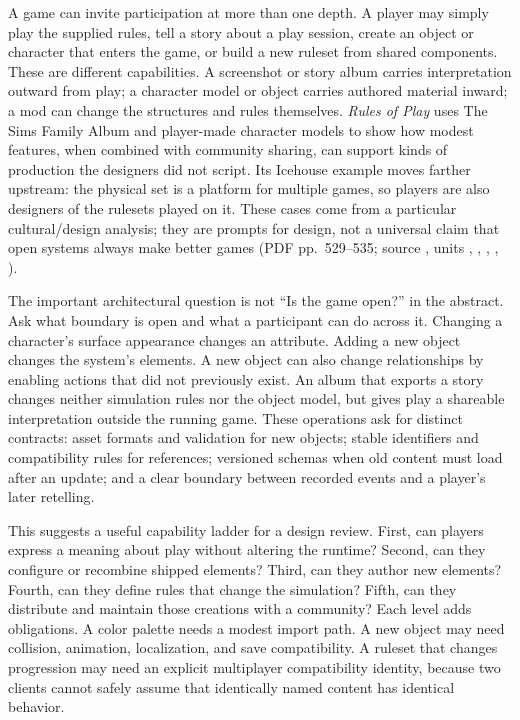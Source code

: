 \hypertarget{06-engine-ii-ch046-design-a-game-system-that-can-be-continued-by-players}{}

A game can invite participation at more than one depth. A player may simply play the supplied rules, tell a story about a play session, create an object or character that enters the game, or build a new ruleset from shared components. These are different capabilities. A screenshot or story album carries interpretation outward from play; a character model or object carries authored material inward; a mod can change the structures and rules themselves. \emph{Rules of Play} uses The Sims Family Album and player-made character models to show how modest features, when combined with community sharing, can support kinds of production the designers did not script. Its Icehouse example moves farther upstream: the physical set is a platform for multiple games, so players are also designers of the rulesets played on it. These cases come from a particular cultural/design analysis; they are prompts for design, not a universal claim that open systems always make better games (PDF pp.~529--535; source , units , , , , ).

The important architectural question is not ``Is the game open?'' in the abstract. Ask what boundary is open and what a participant can do across it. Changing a character's surface appearance changes an attribute. Adding a new object changes the system's elements. A new object can also change relationships by enabling actions that did not previously exist. An album that exports a story changes neither simulation rules nor the object model, but gives play a shareable interpretation outside the running game. These operations ask for distinct contracts: asset formats and validation for new objects; stable identifiers and compatibility rules for references; versioned schemas when old content must load after an update; and a clear boundary between recorded events and a player's later retelling.

This suggests a useful capability ladder for a design review. First, can players express a meaning about play without altering the runtime? Second, can they configure or recombine shipped elements? Third, can they author new elements? Fourth, can they define rules that change the simulation? Fifth, can they distribute and maintain those creations with a community? Each level adds obligations. A color palette needs a modest import path. A new object may need collision, animation, localization, and save compatibility. A ruleset that changes progression may need an explicit multiplayer compatibility identity, because two clients cannot safely assume that identically named content has identical behavior.

